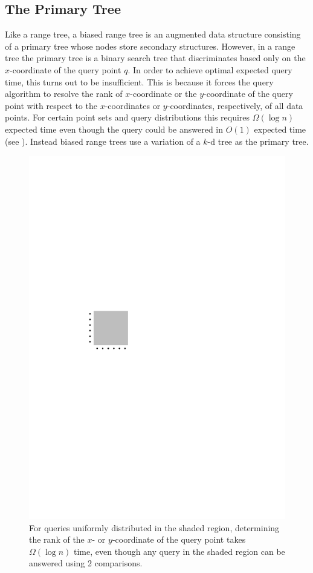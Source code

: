 \documentclass{patmorin}
\begin{document}
\subsection{The Primary Tree}

Like a range tree, a biased range tree is an augmented data structure
consisting of a primary tree whose nodes store secondary structures.
However, in a range tree the primary tree is a binary search tree that
discriminates based only on the $x$-coordinate of the query point $q$.
In order to achieve optimal expected query time, this turns out to be
insufficient.  This is because it forces the query algorithm to resolve
the rank of $x$-coordinate or the $y$-coordinate of the query point
with respect to the $x$-coordinates or $y$-coordinates, respectively,
of all data points. For certain point sets and query distributions this
requires $\Omega(\log n)$ expected time even though the query could
be answered in $O(1)$ expected time (see ).  Instead biased
range trees use a variation of a $k$-d tree as the primary tree.

\begin{figure}
  \begin{center}
    \includegraphics{xy}
  \end{center}
  \caption{For queries uniformly distributed in the shaded region,
  determining the rank of the $x$- or $y$-coordinate of the query point
  takes $\Omega(\log n)$ time, even though any query in the shaded region
  can be answered using 2 comparisons.}
\end{figure}
\end{document}

